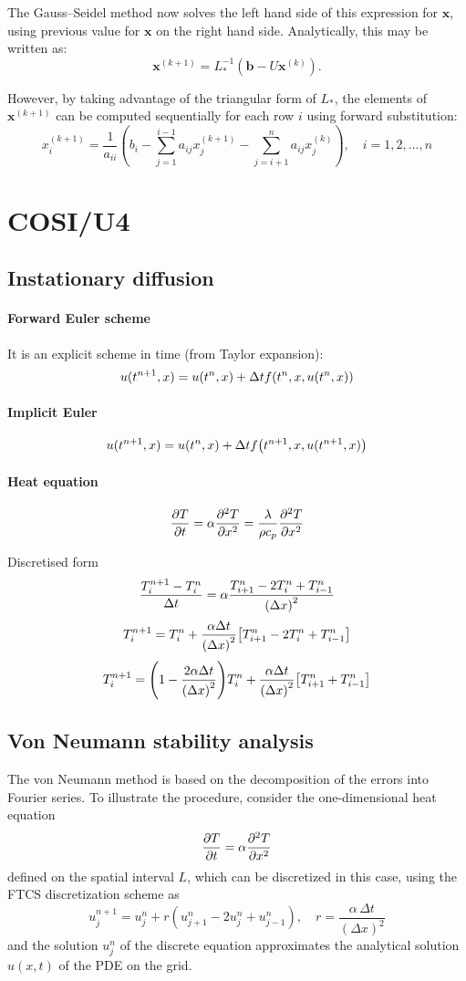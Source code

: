 \documentclass{article}
\begin{document}
The Gauss–Seidel method now solves the left hand side of this expression for $\mathbf{x}$, 
using previous value for $\mathbf{x}$ on the right hand side. Analytically, 
this may be written as:
\[
  \mathbf{x}^{(k+1)} = L_*^{-1} \left(\mathbf{b} - U \mathbf{x}^{(k)}\right).
\]

However, by taking advantage of the triangular form of \(L_{*}\), the elements of 
\(\mathbf {x} ^{(k+1)}\) can be computed sequentially for each row \(i\) using 
forward substitution:
\[
  x^{(k+1)}_i  = \frac{1}{a_{ii}} \left(b_i - \sum_{j=1}^{i-1}a_{ij}x^{(k+1)}_j - \sum_{j=i+1}^{n}a_{ij}x^{(k)}_j \right),\quad i=1,2,\dots,n
\]

\section{COSI/U4}
\subsection{Instationary diffusion}
\paragraph{Forward Euler scheme}
It is an explicit scheme in time (from Taylor expansion):
\[
  u(t^{n+1}, x) = u(t^{n}, x) + \Delta t f\qty(t^{n}, x, u(t^{n}, x))
\]
\paragraph{Implicit Euler}
\[
  u(t^{n+1}, x) = u(t^{n}, x) + \Delta t f\qty(t^{n+1}, x, u(t^{n+1}, x))
\]

\paragraph{Heat equation}
\[
  \pdv{T}{t} = \alpha \pdv[2]{T}{x} = \dfrac{\lambda}{\rho c_p}\pdv[2]{T}{x}
\]

Discretised form
\[
  \dfrac{T_i^{n+1} - T_i^n}{\Delta t} = \alpha\dfrac{T^n_{i+1} - 2 T^n_{i} + T^n_{i-1}}{\qty(\Delta x)^2 }
\]
\[
  T_i^{n+1} = T_i^n + \dfrac{\alpha\Delta t}{\qty(\Delta x)^2}\qty[T^n_{i+1} - 2 T^n_{i} + T^n_{i-1}]
\]
\[
  T_i^{n+1} = \qty(1 - \dfrac{2\alpha\Delta t}{\qty(\Delta x)^2})T_i^n 
  + \dfrac{\alpha\Delta t}{\qty(\Delta x)^2}\qty[T^n_{i+1}  + T^n_{i-1}]
\]

\subsection{Von Neumann stability analysis}
The von Neumann method is based on the decomposition of the errors into 
Fourier series. To illustrate the procedure, consider the one-dimensional 
heat equation
\[
  \pdv{T}{t} = \alpha \pdv[2]{T}{x} 
\]
defined on the spatial interval \(L\), which can be discretized in this case, 
using the FTCS discretization scheme as
\[
u_j^{n + 1} = u_j^n + r \left(u_{j + 1}^n - 2 u_j^n + u_{j - 1}^n \right),\quad
r = \frac{\alpha\, \Delta t}{\left( \Delta x \right)^2}
\]
and the solution \(u_j^{n}\) of the discrete equation approximates 
the analytical solution \(u(x,t)\) of the PDE on the grid.
\end{document}
